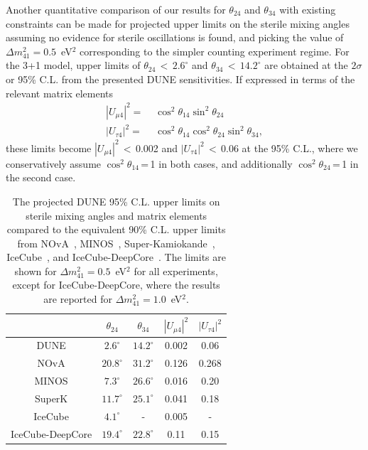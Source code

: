 Another quantitative comparison of our results for $\theta_{24}$ and $\theta_{34}$ with existing constraints can be made for projected upper limits on the sterile mixing angles assuming no evidence for sterile oscillations is found, and picking the value of  $\Delta m^2_{41} = 0.5$~eV$^2$ corresponding to the simpler counting experiment regime. For the 3+1 model, upper limits of $\theta_{24}$\,$<$\,$2.6^{\circ}$ and $\theta_{34}$\,$<$\,$14.2^{\circ}$ are obtained at the $2\sigma$ or 95\% C.L. from the presented DUNE sensitivities. If expressed in terms of the relevant matrix elements
\begin{align}
|U_{\mu4}|^2 =&\,\,\cos^2\theta_{14}\sin^2\theta_{24} \\
|U_{\tau4}|^2= & \,\,\cos^2\theta_{14}\cos^2\theta_{24}\sin^2\theta_{34},
\label{eq:DisapToApp}
\end{align}
these limits become $|U_{\mu4}|^{2}$\,$<$\,0.002 and $|U_{\tau4}|^{2}$\,$<$\,0.06 at the 95\% C.L., where we conservatively assume $\cos^2\theta_{14}$\,=\,1 in both cases, and additionally $\cos^2\theta_{24}$\,=\,1 in the second case.
\begin{table}[!ht]
  \centering
  \begin{tabular}{c c c c c }
    \hline\hline
    & $\theta_{24}$ & $\theta_{34}$ & $|U_{\mu4}|^2$ & $|U_{\tau4}|^2$  \\
    \hline
    DUNE  & $2.6^{\circ}$ & $14.2^{\circ}$ & 0.002 & 0.06  \\
    NOvA  & $20.8^{\circ}$ & $31.2^{\circ}$ & 0.126 & 0.268  \\
    MINOS & $7.3^{\circ}$ & $26.6^{\circ}$ & 0.016 & 0.20  \\
    SuperK & $11.7^{\circ}$ & $25.1^{\circ}$ & 0.041 & 0.18  \\
    IceCube & $4.1^{\circ}$ & \-- & 0.005 & \--   \\
    IceCube-DeepCore & $19.4^{\circ}$ & $22.8^{\circ}$ & 0.11 & 0.15  \\
    \hline\hline
  \end{tabular}%
    \caption{The projected DUNE 95\% C.L. upper limits on sterile mixing angles and matrix elements compared to the equivalent 90\% C.L. upper limits from NOvA~\cite{ref:novasterile}, MINOS~\cite{ref:minossterile}, Super-Kamiokande~\cite{ref:superksterile}, IceCube~\cite{ref:IceCube}, and IceCube-DeepCore~\cite{ref:DeepCore}. The limits are shown for $\Delta m^2_{41} = 0.5$~eV$^2$ for all experiments, except for IceCube-DeepCore, where the results are reported for $\Delta m^2_{41} = 1.0$~eV$^2$.}
  \label{tab:limits}
\end{table}  
  

